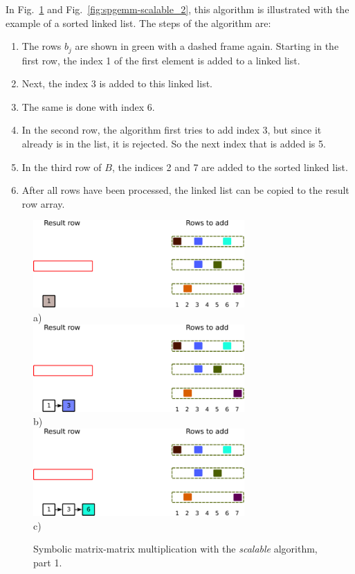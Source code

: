 In Fig.~\ref{fig:spgemm-scalable_1} and Fig.~\ref{fig:spgemm-scalable_2}, this algorithm is illustrated with the example of a sorted linked list. The steps of the algorithm are:

\begin{enumerate}[label=\alph*)]
\item The rows $b_j$ are shown in green with a dashed frame again. Starting in the first row, the index 1 of the first element is added to a linked list. 
\item Next, the index 3 is added to this linked list.
\item The same is done with index 6. 
\item In the second row, the algorithm first tries to add index 3, but since it already is in the list, it is rejected. So the next index that is added is 5. 
\item In the third row of $B$, the indices 2 and 7 are added to the sorted linked list.
\item After all rows have been processed, the linked list can be copied to the result row array.
\end{enumerate}


\begin{figure}[H]
\centering
\includegraphics[width=0.72\textwidth]{scalable/spgemm-scalable-3}\\
a)\\
\vspace*{5mm}
\includegraphics[width=0.72\textwidth]{scalable/spgemm-scalable-4}\\
b)\\
\vspace*{5mm}
\includegraphics[width=0.72\textwidth]{scalable/spgemm-scalable-5}\\
c)\\
\vspace*{5mm}
\caption{Symbolic matrix-matrix multiplication with the \textit{scalable} algorithm, part 1.}
\label{fig:spgemm-scalable_1}
\end{figure}


